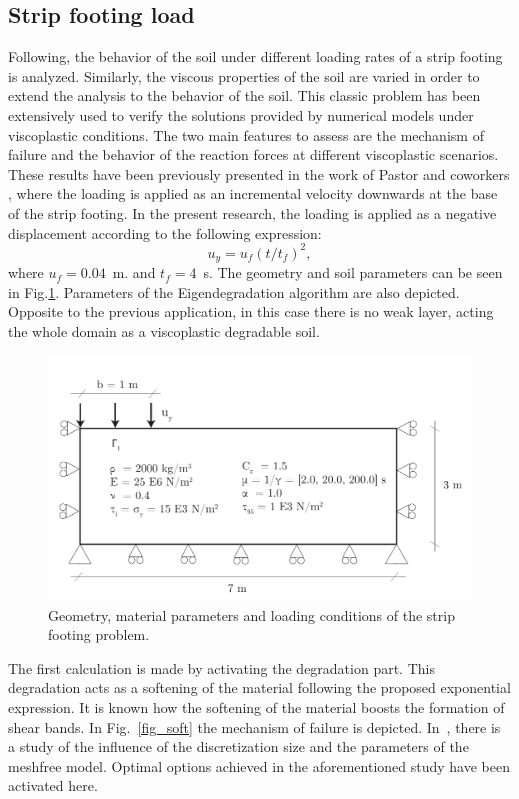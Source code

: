 \documentclass[applsci,journal,article,submit,moreauthors,pdftex]{Definitions/mdpi}
\begin{document}
\subsection{Strip footing load}
\label{S42}
Following, the behavior of the soil under different loading rates of a strip footing is analyzed. Similarly, the viscous properties of the soil are varied in order to extend the analysis to the behavior of the soil. This classic problem has been extensively used to verify the solutions provided by numerical models under viscoplastic conditions. The two main features to assess are the mechanism of failure and the behavior of the reaction forces at different viscoplastic scenarios. These results have been previously presented in the work of Pastor and coworkers \cite{BlancPastor2012,Navas2018}, where the loading is applied as an incremental velocity downwards at the base of the strip footing. In the present research, the loading is applied as a negative displacement according to the following expression: $$u_y=u_f\left(t/t_f\right)^2,$$ 
where $u_f=0.04$~m. and $t_f=4$~s. The geometry and soil parameters can be seen in Fig.\ref{fig_geozap}. Parameters of the Eigendegradation algorithm are also depicted. Opposite to the previous application, in this case there is no weak layer, acting the whole domain as a viscoplastic degradable soil.

\begin{figure}[!t]
\begin{center}
\includegraphics[width=12cm]{Figs/geo_zap.pdf}
\caption{Geometry, material parameters and loading conditions of the strip footing problem.}
\label{fig_geozap}
\end{center}
\end{figure}

The first calculation is made by activating the degradation part. This degradation acts as a softening of the material following the proposed exponential expression. It is known how the softening of the material boosts the formation of shear bands. In Fig.~\ref{fig_soft} the mechanism of failure is depicted. In~\cite{Navas2018}, there is a study of the influence of the discretization size and the parameters of the meshfree model. Optimal options achieved in the aforementioned study have been activated here.
\end{document}
